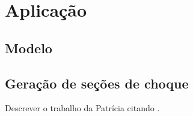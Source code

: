 \chapter{Aplicação}
\label{chap:aplicacao}


\section{Modelo}


\section{Geração de seções de choque}

Descrever o trabalho da Patrícia citando \cite{Reis2015}.


